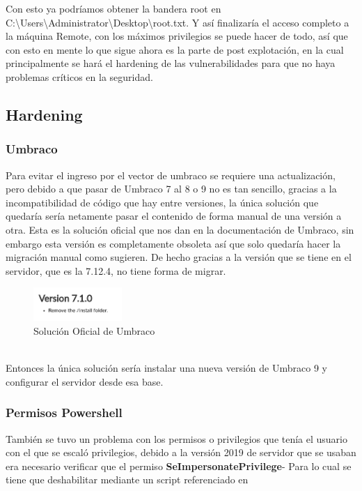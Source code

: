 \documentclass{article}
\begin{document}
Con esto ya podríamos obtener la bandera root en C:\textbackslash Users\textbackslash Administrator\textbackslash Desktop\textbackslash root.txt.
Y así finalizaría el acceso completo a la máquina Remote, con los máximos privilegios se puede hacer de todo, así que con esto en mente lo que sigue ahora es la parte de post explotación, en la cual principalmente se hará el hardening de las vulnerabilidades para que no haya problemas críticos en la seguridad.
\clearpage

\subsection{Hardening}

\subsubsection{Umbraco}

Para evitar el ingreso por el vector de umbraco se requiere una actualización, pero debido a que pasar de Umbraco 7 al 8 o 9 no es tan sencillo, gracias a la incompatibilidad de código que hay entre versiones, la única solución que quedaría sería netamente pasar el contenido de forma manual de una versión a otra.
Esta es la solución oficial que nos dan en la documentación de Umbraco, sin embargo esta versión es completamente obsoleta así que solo quedaría hacer la migración manual como sugieren.
De hecho gracias a la versión que se tiene en el servidor, que es la 7.12.4, no tiene forma de migrar.
\begin{figure}[h]
	\center 
	\includegraphics[width=0.3\textwidth]{images/remote/umbraco-version.png}
	\caption{Solución Oficial de Umbraco}
\end{figure}
\\ Entonces la única solución sería instalar una nueva versión de Umbraco 9 y configurar el servidor desde esa base.

\subsubsection{Permisos Powershell}

También se tuvo un problema con los permisos o privilegios que tenía el usuario con el que se escaló privilegios, debido a la versión 2019 de servidor que se usaban era necesario verificar que el permiso \textbf{SeImpersonatePrivilege}-
Para lo cual se tiene que deshabilitar mediante un script referenciado en 
\end{document}
